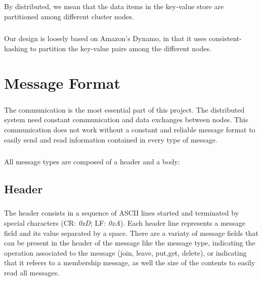 \documentclass{report}
\begin{document}
			\paragraph{}By distributed, we mean that the data items in the key-value
			store are partitioned among different cluster nodes.
			
			\paragraph{} Our design is loosely based on Amazon's Dynamo, in that it
			uses consistent-hashing to partition the key-value pairs among the 
			different nodes.
	
	\chapter{Message Format}

			\paragraph{} The communication is the most essential part of this project. The
			distributed system need constant communication and data exchanges between nodes.
			This communication does not work without a constant and reliable message format
			to easily send and read information contained in every type of message.
			
			\paragraph{} All message types are composed of a header and a body:
	        
	        \section{Header}
	
				\paragraph{} The header consists in a sequence of ASCII lines started and
				terminated by special characters (CR: \emph{0xD}; LF: \emph{0xA}). Each
				header line represents a message field and its value separated by a space.
				There are a variaty of message fields that can be present in the header of
				the message like the message type, indicating the operation associated to the
				message (join, leave, put,get, delete), or indicating that it refeers to a 
				membership message, as well the size of the contents to easily read all messages.
			
\end{document}
